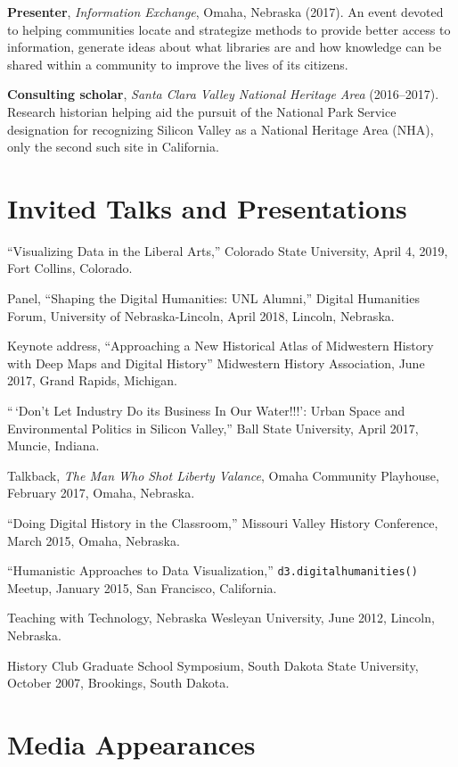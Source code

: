 \textbf{Presenter}, \emph{Information Exchange}, Omaha, Nebraska (2017).
An event devoted to helping communities locate and strategize methods to
provide better access to information, generate ideas about what
libraries are and how knowledge can be shared within a community to
improve the lives of its citizens.

\textbf{Consulting scholar}, \emph{Santa Clara Valley National Heritage
Area} (2016--2017). Research historian helping aid the pursuit of the
National Park Service designation for recognizing Silicon Valley as a
National Heritage Area (NHA), only the second such site in California.

\section{Invited Talks and
Presentations}\label{invited-talks-and-presentations}

``Visualizing Data in the Liberal Arts,'' Colorado State University,
April 4, 2019, Fort Collins, Colorado.

Panel, ``Shaping the Digital Humanities: UNL Alumni,'' Digital
Humanities Forum, University of Nebraska-Lincoln, April 2018, Lincoln,
Nebraska.

Keynote address, ``Approaching a New Historical Atlas of Midwestern
History with Deep Maps and Digital History'' Midwestern History
Association, June 2017, Grand Rapids, Michigan.

``\,`Don't Let Industry Do its Business In Our Water!!!': Urban Space
and Environmental Politics in Silicon Valley,'' Ball State University,
April 2017, Muncie, Indiana.

Talkback, \emph{The Man Who Shot Liberty Valance}, Omaha Community
Playhouse, February 2017, Omaha, Nebraska.

``Doing Digital History in the Classroom,'' Missouri Valley History
Conference, March 2015, Omaha, Nebraska.

``Humanistic Approaches to Data Visualization,''
\texttt{d3.digitalhumanities()} Meetup, January 2015, San Francisco,
California.

Teaching with Technology, Nebraska Wesleyan University, June 2012,
Lincoln, Nebraska.

History Club Graduate School Symposium, South Dakota State University,
October 2007, Brookings, South Dakota.

\section{Media Appearances}\label{media-appearances}

